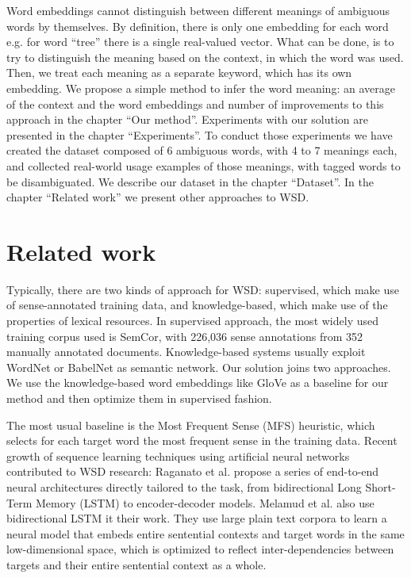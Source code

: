 \documentclass{llncs}
\begin{document}
Word embeddings cannot distinguish between different meanings of ambiguous words by themselves. By definition, there is only one embedding for each word e.g. for word ``tree'' there is a single real-valued vector. What can be done, is to try to distinguish the meaning based on the context, in which the word was used. Then, we treat each meaning as a separate keyword, which has its own embedding.
We propose a simple method to infer the word meaning: an average of the context and the word embeddings and number of improvements to this approach in the chapter ``Our method''. Experiments with our solution are presented in the chapter ``Experiments''. To conduct those experiments we have created the dataset composed of 6 ambiguous words, with 4 to 7 meanings each, and collected real-world usage examples of those meanings, with tagged words to be disambiguated. We describe our dataset in the chapter ``Dataset''. In the chapter ``Related work'' we present other approaches to WSD.

\section{Related work}
\label{related work}

Typically, there are two kinds of approach for WSD: supervised, which make use of sense-annotated training data, and knowledge-based, which make use of the properties of lexical resources. In supervised approach, the most widely used training corpus used is SemCor\cite{semcor}, with 226,036 sense annotations from 352 manually annotated documents.
Knowledge-based systems usually exploit WordNet\cite{wordnet} or BabelNet\cite{babelnet} as semantic network.
Our solution joins two approaches. We use the knowledge-based word embeddings like GloVe\cite{GloVe} as a baseline for our method and then optimize them in supervised fashion.

The most usual baseline is the Most Frequent Sense\cite{evalmfs} (MFS) heuristic, which selects for each target word the most frequent sense in the training data.
Recent growth of sequence learning techniques using artificial neural networks contributed to WSD research: Raganato et al.\cite{neuralseqmodelingforWSD} propose a series of end-to-end neural architectures directly tailored to the task, from bidirectional Long Short-Term Memory (LSTM) to encoder-decoder models. Melamud et al.\cite{context2vec} also use bidirectional LSTM it their work. They use large plain text corpora to learn a neural model that embeds entire sentential contexts and target words in the same low-dimensional space, which is optimized to reflect inter-dependencies between targets and their entire sentential context as a whole.
\end{document}
